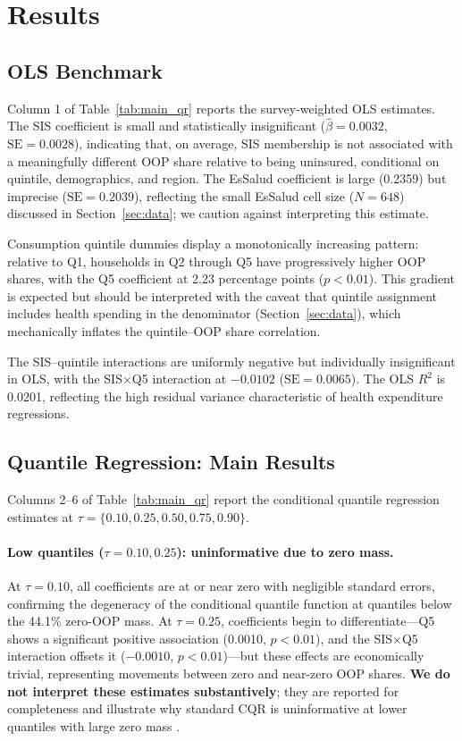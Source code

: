 \section{Results}\label{sec:results}

\subsection{OLS Benchmark}

Column 1 of Table~\ref{tab:main_qr} reports the survey-weighted OLS estimates. The SIS coefficient is small and statistically insignificant ($\hat{\beta} = 0.0032$, $\text{SE} = 0.0028$), indicating that, on average, SIS membership is not associated with a meaningfully different OOP share relative to being uninsured, conditional on quintile, demographics, and region. The EsSalud coefficient is large (0.2359) but imprecise ($\text{SE} = 0.2039$), reflecting the small EsSalud cell size ($N = 648$) discussed in Section~\ref{sec:data}; we caution against interpreting this estimate.

Consumption quintile dummies display a monotonically increasing pattern: relative to Q1, households in Q2 through Q5 have progressively higher OOP shares, with the Q5 coefficient at 2.23 percentage points ($p < 0.01$). This gradient is expected but should be interpreted with the caveat that quintile assignment includes health spending in the denominator (Section~\ref{sec:data}), which mechanically inflates the quintile--OOP share correlation.

The SIS--quintile interactions are uniformly negative but individually insignificant in OLS, with the SIS$\times$Q5 interaction at $-0.0102$ ($\text{SE} = 0.0065$). The OLS $R^2$ is 0.0201, reflecting the high residual variance characteristic of health expenditure regressions.

\subsection{Quantile Regression: Main Results}

Columns 2--6 of Table~\ref{tab:main_qr} report the conditional quantile regression estimates at $\tau = \{0.10, 0.25, 0.50, 0.75, 0.90\}$.



\paragraph{Low quantiles ($\tau = 0.10, 0.25$): uninformative due to zero mass.} At $\tau = 0.10$, all coefficients are at or near zero with negligible standard errors, confirming the degeneracy of the conditional quantile function at quantiles below the 44.1\% zero-OOP mass. At $\tau = 0.25$, coefficients begin to differentiate---Q5 shows a significant positive association (0.0010, $p < 0.01$), and the SIS$\times$Q5 interaction offsets it ($-0.0010$, $p < 0.01$)---but these effects are economically trivial, representing movements between zero and near-zero OOP shares. \textbf{We do not interpret these estimates substantively}; they are reported for completeness and illustrate why standard CQR is uninformative at lower quantiles with large zero mass \citep{MachadoSilva2005}.

